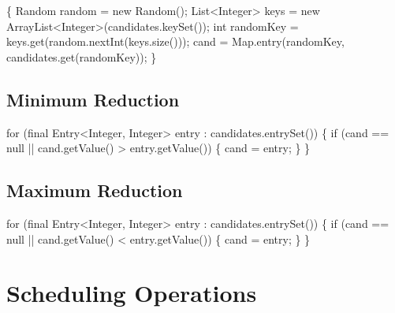 \nwenddocs{}\endmoddef\nwstartdeflinemarkup{}\nwenddeflinemarkup
\{
  Random random = new Random();
  List<Integer> keys = new ArrayList<Integer>(candidates.keySet());
  int randomKey = keys.get(random.nextInt(keys.size()));
  cand = Map.entry(randomKey, candidates.get(randomKey));
\}
\nwendcode{}\nwdocspar

\section{Minimum Reduction}

\nwenddocs{}\endmoddef\nwstartdeflinemarkup{}\nwenddeflinemarkup
for (final Entry<Integer, Integer> entry : candidates.entrySet()) \{
  if (cand == null || cand.getValue() > entry.getValue()) \{
    cand = entry;
  \}
\}
\nwendcode{}\nwdocspar

\section{Maximum Reduction}

\nwenddocs{}\endmoddef\nwstartdeflinemarkup\nwenddeflinemarkup
for (final Entry<Integer, Integer> entry : candidates.entrySet()) \{
  if (cand == null || cand.getValue() < entry.getValue()) \{
    cand = entry;
  \}
\}
\nwendcode{}\nwdocspar

\nwenddocs{}\chapter{Scheduling Operations}
\label{search-scheduling}

